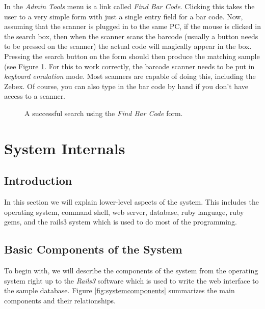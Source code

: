 \documentclass[12pt,twoside]{article}
\begin{document}
In the \emph{Admin Tools} menu is a link called \emph{Find Bar Code}.
Clicking this takes the user to a very simple form with just a single
entry field for a bar code. Now, assuming that the scanner is plugged in to
the same PC, if the mouse is clicked in the search box, then when the
scanner scans the barcode (usually a button needs to be pressed on the 
scanner) the actual code will magically appear in the box. Pressing
the search button on the form should then produce the matching sample
(see Figure \ref{fig:barcodeform}. 
For this to work correctly, the
barcode scanner needs to be put in \emph{keyboard emulation} mode.
Most scanners are capable of doing this, including the Zebex.
Of course, you can also type in the bar code by hand if you don't
have access to a scanner.

\begin{figure}[!h]
\begin{center}
\caption{A successful search using the \emph{Find Bar Code} form.
\label{fig:barcodeform}}
\end{center}
\end{figure}

\section{System Internals}
\subsection{Introduction}
In this section we will explain lower-level aspects of the system.
This includes the operating system, command shell, web server, 
database, ruby language, ruby gems, and the rails3 system which is
used to do most of the programming.

\subsection{Basic Components of the System}
To begin with, we will describe the components of the system from the
operating system right up to the \emph{Rails3} software which is used
to write the web interface to the sample database.
Figure \ref{fig:systemcomponents} summarizes the main components and
their relationships.
\end{document}
